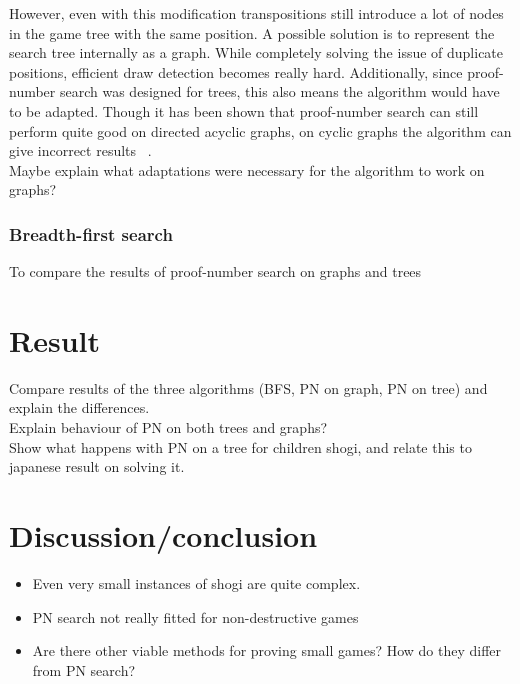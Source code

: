 \documentclass{article}
\begin{document}
However, even with this modification transpositions still introduce a lot of nodes in the game tree with the same position. A possible solution
is to represent the search tree internally as a graph. While completely solving the issue of duplicate positions, efficient draw detection becomes
really hard. Additionally, since proof-number search was designed for trees, this also means the algorithm would have to be adapted.
Though it has been shown that proof-number search can still perform quite good on directed acyclic graphs, on cyclic graphs the algorithm
can give incorrect results ~\cite{TODO}.\\

Maybe explain what adaptations were necessary for the algorithm to work on graphs?

\subsubsection*{Breadth-first search}
To compare the results of proof-number search on graphs and trees

\section{Result}
Compare results of the three algorithms (BFS, PN on graph, PN on tree) and explain the differences.\\

Explain behaviour of PN on both trees and graphs?\\

Show what happens with PN on a tree for children shogi, and relate this to japanese result on solving it.

\section{Discussion/conclusion}
\begin{itemize}
	\item Even very small instances of shogi are quite complex.
	\item PN search not really fitted for non-destructive games
	\item Are there other viable methods for proving small games? How do they differ from PN search?
\end{itemize}

{}

\end{document}

